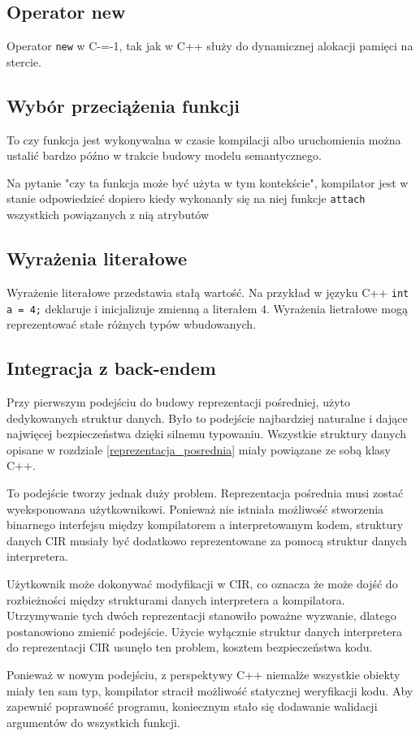 \subsection{Operator new}
\label{operator_new}
Operator \lstinline{new} w C-=-1, tak jak w C++ służy do dynamicznej alokacji pamięci na stercie.

\subsection{Wybór przeciążenia funkcji}
\label{Function_overload_resolution}
To czy funkcja jest wykonywalna w czasie kompilacji albo uruchomienia można ustalić bardzo późno w trakcie budowy modelu semantycznego.

Na pytanie "czy ta funkcja może być użyta w tym kontekście", kompilator jest w stanie odpowiedzieć dopiero kiedy wykonanły się na niej funkcje \lstinline{attach} wszystkich powiązanych z nią atrybutów 
\subsection{Wyrażenia literałowe}

Wyrażenie literałowe przedstawia stałą wartość.
Na przykład w języku C++ \lstinline{int a = 4;} deklaruje i inicjalizuje zmienną a literałem 4.
Wyrażenia lietrałowe mogą reprezentować stałe różnych typów wbudowanych.

\subsection{Integracja z back-endem}
Przy pierwszym podejściu do budowy reprezentacji pośredniej, użyto dedykowanych struktur danych. Było to podejście najbardziej naturalne i dające najwięcej bezpieczeństwa dzięki silnemu typowaniu. Wszystkie struktury danych opisane w rozdziale \ref{reprezentacja_posrednia} miały powiązane ze sobą klasy C++.


To podejście tworzy jednak duży problem. Reprezentacja pośrednia musi zostać wyeksponowana użytkownikowi. Ponieważ nie istniała możliwość stworzenia binarnego interfejsu między kompilatorem a interpretowanym kodem, struktury danych CIR musiały być dodatkowo reprezentowane za pomocą struktur danych interpretera.


Użytkownik może dokonywać modyfikacji w CIR, co oznacza że może dojść do rozbieżności między strukturami danych interpretera a kompilatora. Utrzymywanie tych dwóch reprezentacji stanowiło poważne wyzwanie, dlatego postanowiono zmienić podejście. Użycie wyłącznie struktur danych interpretera do reprezentacji CIR usunęło ten problem, kosztem bezpieczeństwa kodu.


Ponieważ w nowym podejściu, z perspektywy C++ niemalże wszystkie obiekty miały ten sam typ, kompilator stracił możliwość statycznej weryfikacji kodu.
Aby zapewnić poprawność programu, koniecznym stało się dodawanie walidacji argumentów do wszystkich funkcji.
